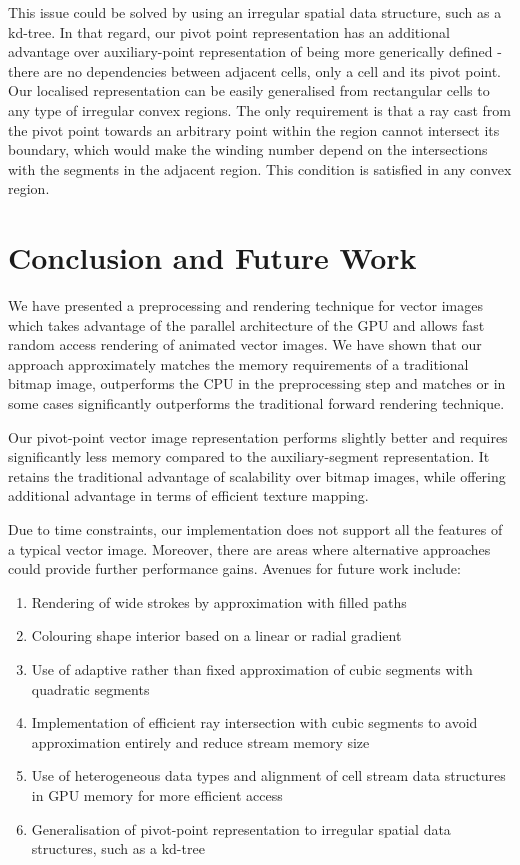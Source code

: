 \documentclass[11pt,a4paper,twoside]{article}
\begin{document}
This issue could be solved by using an irregular spatial data structure, such as a kd-tree. In that regard, our pivot point representation has an additional advantage over auxiliary-point representation of being more generically defined - there are no dependencies between adjacent cells, only a cell and its pivot point. Our localised representation can be easily generalised from rectangular cells to any type of irregular convex regions. The only requirement is that a ray cast from the pivot point towards an arbitrary point within the region cannot intersect its boundary, which would make the winding number depend on the intersections with the segments in the adjacent region. This condition is satisfied in any convex region.

\section {Conclusion and Future Work}

We have presented a preprocessing and rendering technique for vector images which takes advantage of the parallel architecture of the GPU and allows fast random access rendering of animated vector images. We have shown that our approach approximately matches the memory requirements of a traditional bitmap image, outperforms the CPU in the preprocessing step and matches or in some cases significantly outperforms the traditional forward rendering technique.

Our pivot-point vector image representation performs slightly better and requires significantly less memory compared to the auxiliary-segment representation. It retains the traditional advantage of scalability over bitmap images, while offering additional advantage in terms of efficient texture mapping.

Due to time constraints, our implementation does not support all the features of a typical vector image. Moreover, there are areas where alternative approaches could provide further performance gains. Avenues for future work include:

\begin {enumerate}
\item
Rendering of wide strokes by approximation with filled paths
\item
Colouring shape interior based on a linear or radial gradient
\item
Use of adaptive rather than fixed approximation of cubic segments with quadratic segments
\item
Implementation of efficient ray intersection with cubic segments to avoid approximation entirely and reduce stream memory size
\item
Use of heterogeneous data types and alignment of cell stream data structures in GPU memory for more efficient access
\item
Generalisation of pivot-point representation to irregular spatial data structures, such as a kd-tree
\end {enumerate}
\end{document}
